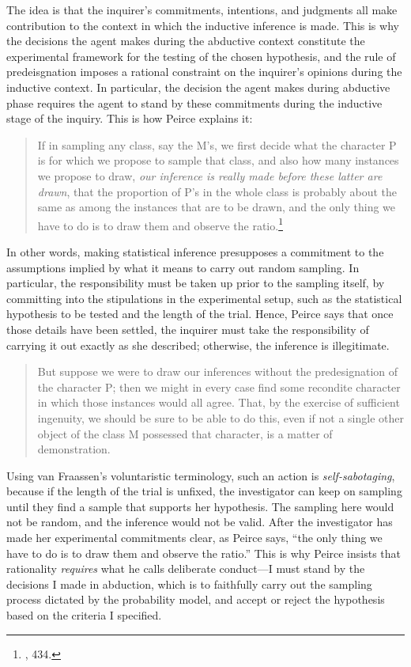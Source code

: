 The idea is that the inquirer's commitments, intentions, and judgments
all make contribution to the context in which the inductive inference is
made. This is why the decisions the agent makes during the abductive
context constitute the experimental framework for the testing of the
chosen hypothesis, and the rule of predeisgnation imposes a rational
constraint on the inquirer's opinions during the inductive context. In
particular, the decision the agent makes during abductive phase requires
the agent to stand by these commitments during the inductive stage of
the inquiry. This is how Peirce explains it:

\begin{quote}
If in sampling any class, say the M's, we first decide what the
character P is for which we propose to sample that class, and also how
many instances we propose to draw, \emph{our inference is really made
before these latter are drawn}, that the proportion of P's in the whole
class is probably about the same as among the instances that are to be
drawn, and the only thing we have to do is to draw them and observe the
ratio.\footnote{\cite{probableinference}, 434.}
\end{quote}

In other words, making statistical inference presupposes a commitment to
the assumptions implied by what it means to carry out random sampling.
In particular, the responsibility must be taken up prior to the sampling
itself, by committing into the stipulations in the experimental setup,
such as the statistical hypothesis to be tested and the length of the
trial. Hence, Peirce says that once those details have been settled, the
inquirer must take the responsibility of carrying it out exactly as she
described; otherwise, the inference is illegitimate.

\begin{quote}
But suppose we were to draw our inferences without the predesignation of
the character P; then we might in every case find some recondite
character in which those instances would all agree. That, by the
exercise of sufficient ingenuity, we should be sure to be able to do
this, even if not a single other object of the class M possessed that
character, is a matter of demonstration.
\end{quote}

Using van Fraassen's voluntaristic terminology, such an action is
\emph{self-sabotaging}, because if the length of the trial is unfixed,
the investigator can keep on sampling until they find a sample that
supports her hypothesis. The sampling here would not be random, and the
inference would not be valid. After the investigator has made her
experimental commitments clear, as Peirce says, ``the only thing we have
to do is to draw them and observe the ratio.'' This is why Peirce
insists that rationality \emph{requires} what he calls deliberate
conduct---I must stand by the decisions I made in abduction, which is to
faithfully carry out the sampling process dictated by the probability
model, and accept or reject the hypothesis based on the criteria I
specified. 

